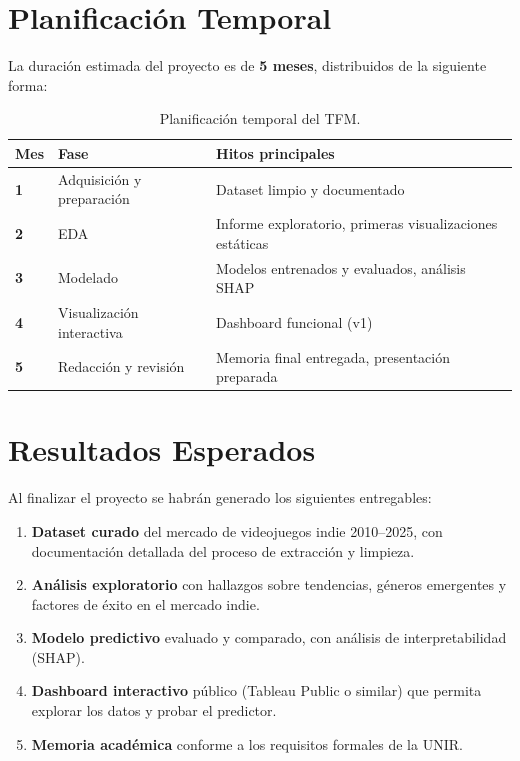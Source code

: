\documentclass[12pt, a4paper]{article}
\begin{document}
\section{Planificaci\'on Temporal}

La duraci\'on estimada del proyecto es de \textbf{5 meses}, distribuidos de la siguiente forma:

\begin{table}[h!]
\centering
\renewcommand{\arraystretch}{1.4}
\begin{tabular}{>{\bfseries}p{1.2cm} p{4.5cm} p{7cm}}
\toprule
Mes & Fase & Hitos principales \\
\midrule
1   & Adquisici\'on y preparaci\'on  & Dataset limpio y documentado \\
2   & EDA                        & Informe exploratorio, primeras visualizaciones est\'aticas \\
3   & Modelado                   & Modelos entrenados y evaluados, an\'alisis SHAP \\
4   & Visualizaci\'on interactiva  & Dashboard funcional (v1) \\
5   & Redacci\'on y revisi\'on       & Memoria final entregada, presentaci\'on preparada \\
\bottomrule
\end{tabular}
\caption{Planificaci\'on temporal del TFM.}
\end{table}

\section{Resultados Esperados}

Al finalizar el proyecto se habr\'an generado los siguientes entregables:

\begin{enumerate}[leftmargin=*, label=\textbf{R\arabic*.}]
  \item \textbf{Dataset curado} del mercado de videojuegos indie 2010--2025, con documentaci\'on detallada del proceso de extracci\'on y limpieza.
  \item \textbf{An\'alisis exploratorio} con hallazgos sobre tendencias, g\'eneros emergentes y factores de \'exito en el mercado indie.
  \item \textbf{Modelo predictivo} evaluado y comparado, con an\'alisis de interpretabilidad (SHAP).
  \item \textbf{Dashboard interactivo} p\'ublico (Tableau Public o similar) que permita explorar los datos y probar el predictor.
  \item \textbf{Memoria acad\'emica} conforme a los requisitos formales de la UNIR.
\end{enumerate}
\end{document}
